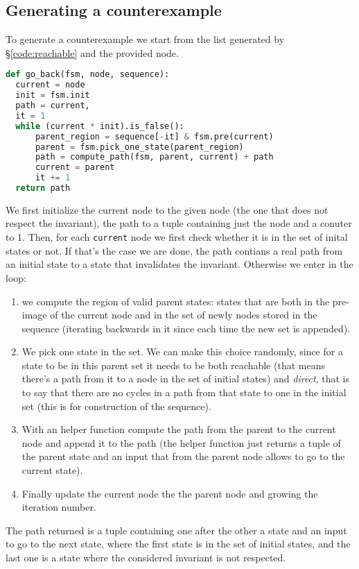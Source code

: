 \documentclass[9pt,oneside]{amsart}
\begin{document}
\begin{multicols}{2}
\section{Generating a counterexample}\label{back}
To generate a counterexample we start from the list generated by
\S\ref{code:reachable} and the provided node.
\begin{lstlisting}[language=Python]
def go_back(fsm, node, sequence):
  current = node
  init = fsm.init
  path = current,
  it = 1
  while (current * init).is_false():
      parent_region = sequence[-it] & fsm.pre(current)
      parent = fsm.pick_one_state(parent_region)
      path = compute_path(fsm, parent, current) + path
      current = parent
      it += 1
  return path
\end{lstlisting}
We first initialize the current node to the given node (the one that
does not respect the invariant), the path to a tuple containing just
the node and a conuter to 1. Then, for each \texttt{current} node we
first check whether it is in the set of inital states or not. If
that's the case we are done, the path contians a real path from an
initial state to a state that invalidates the invariant. Otherwise we
enter in the loop:
\begin{enumerate}
\item we compute the region of valid parent states: states that are
  both in the pre-image of the current node and in the set of newly
  nodes stored in the sequence (iterating backwards in it since each
  time the new set is appended).
\item We pick one state in the set. We can make this choice randomly,
  since for a state to be in this parent set it needs to be both
  reachable (that means there's a path from it to a node in the set of
  initial states) and \textit{direct}, that is to say that there are
  no cycles in a path from that state to one in the initial set (this
  is for construction of the sequence).
\item With an helper function compute the path from the parent to the
  current node and append it to the path (the helper function just
  returns a tuple of the parent state and an input that from the
  parent node allows to go to the current state).
\item Finally update the current node the the parent node and growing
  the iteration number.
\end{enumerate}
The path returned is a tuple containing one after the other a state
and an input to go to the next state, where the first state is in the
set of initial states, and the last one is a state where the
considered invariant is not respected.
\end{multicols}
\end{document}
